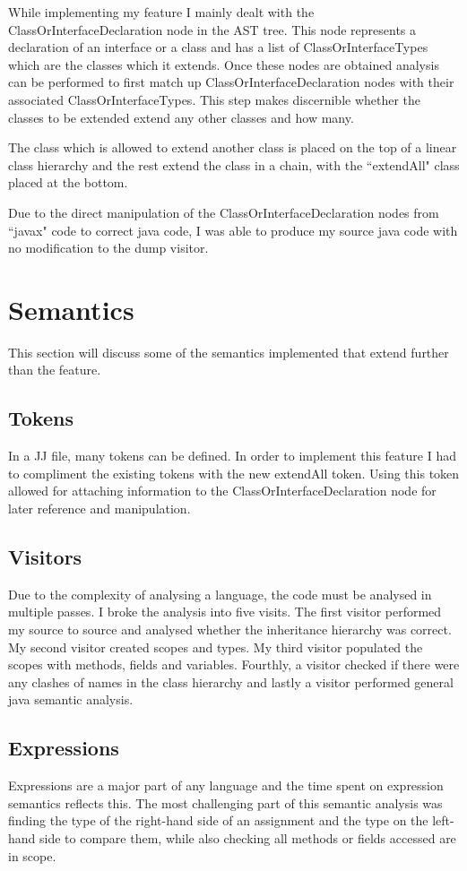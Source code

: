 \documentclass[twocolumn]{article} 	%
\begin{document}
While implementing my feature I mainly dealt with the ClassOrInterfaceDeclaration node in the AST tree. This node represents a declaration of an interface or a class and has a list of ClassOrInterfaceTypes which are the classes which it extends. Once these nodes are obtained analysis can be performed to first match up ClassOrInterfaceDeclaration nodes with their associated ClassOrInterfaceTypes. This step makes discernible whether the classes to be extended extend any other classes and how many.

The class which is allowed to extend another class is placed on the top of a linear class hierarchy and the rest extend the class in a chain, with the ``extendAll" class placed at the bottom.

Due to the direct manipulation of the ClassOrInterfaceDeclaration nodes from ``javax" code to  correct java code, I was able to produce my source java code with no modification to the dump visitor.
\section{Semantics}
This section will discuss some of the semantics implemented that extend further than the feature.
\subsection{Tokens}
In a JJ file, many tokens can be defined. In order to implement this feature I had to compliment the existing tokens with the new extendAll  token. Using this token allowed for attaching information to the ClassOrInterfaceDeclaration node for later reference and manipulation.
\subsection{Visitors}
Due to the complexity of analysing a language, the code must be analysed in multiple passes. I broke the analysis into five visits. The first visitor performed my source to source and analysed  whether the inheritance hierarchy was correct. My second visitor created scopes and types. My third visitor populated the scopes with methods, fields and variables.  Fourthly, a visitor checked if there were any clashes of names in the class hierarchy and lastly a visitor performed general java semantic analysis.
\subsection{Expressions}
Expressions are a major part of any language and the time spent on expression semantics reflects this. The most challenging part of this semantic analysis was finding the type of the right-hand side of an assignment and the type on the left-hand side to compare them, while also checking all methods or fields accessed are in scope.
\end{document}
